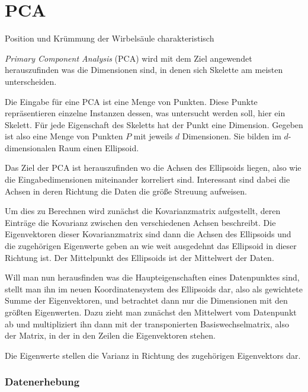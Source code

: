 \chapter{PCA}

 Position und Krümmung der Wirbelsäule charakteristisch 

 \emph{Primary Component Analysis} (PCA) wird mit dem Ziel angewendet herauszufinden was die Dimensionen sind, in denen sich Skelette am meisten unterscheiden. 
 
 Die Eingabe für eine PCA ist eine Menge von Punkten. Diese Punkte repräsentieren einzelne Instanzen dessen, was untersucht werden soll, hier ein Skelett. Für jede Eigenschaft des Skeletts hat der Punkt eine Dimension. Gegeben ist also eine Menge von Punkten $P$ mit jeweils $d$ Dimensionen. Sie bilden im $d$-dimensionalen Raum einen Ellipsoid.
 
 Das Ziel der PCA ist herauszufinden wo die Achsen des Ellipsoids liegen, also wie die Eingabedimensionen miteinander korreliert sind. Interessant sind dabei die Achsen in deren Richtung die Daten die größe Streuung aufweisen.
 
 Um dies zu Berechnen wird zunächst die Kovarianzmatrix aufgestellt, deren Einträge die Kovarianz zwischen den verschiedenen Achsen beschreibt.
 Die Eigenvektoren dieser Kovarianzmatrix sind dann die Achsen des Ellipsoids und die zugehörigen Eigenwerte geben an wie weit ausgedehnt das Ellipsoid in dieser Richtung ist. Der Mittelpunkt des Ellipsoids ist der Mittelwert der Daten.
 
 Will man nun herausfinden was die Haupteigenschaften eines Datenpunktes sind, stellt man ihn im neuen Koordinatensystem des Ellipsoids dar, also als gewichtete Summe der Eigenvektoren, und betrachtet dann nur die Dimensionen mit den größten Eigenwerten. Dazu zieht man zunächst den Mittelwert vom Datenpunkt ab und multipliziert ihn dann mit der transponierten Basiswechselmatrix, also der Matrix, in der in den Zeilen die Eigenvektoren stehen.
 
 Die Eigenwerte stellen die Varianz in Richtung des zugehörigen Eigenvektors dar. 

 \subsection{Datenerhebung}
 
